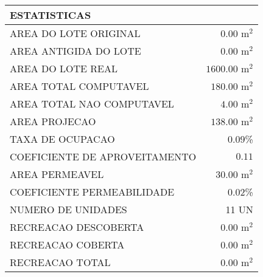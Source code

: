 \documentclass[10pt]{article}
\begin{document}
\begin{tabular}{l r}
\hline
ESTATISTICAS &  \\
\hline
AREA DO LOTE ORIGINAL & $0.00$ m$^2$ \\
AREA ANTIGIDA DO LOTE & $0.00$ m$^2$ \\
AREA DO LOTE REAL & $1600.00$ m$^2$ \\
AREA TOTAL COMPUTAVEL & $180.00$ m$^2$ \\
AREA TOTAL NAO COMPUTAVEL & $4.00$ m$^2$ \\
AREA PROJECAO & $138.00$ m$^2$ \\
TAXA DE OCUPACAO & $0.09$\% \\
COEFICIENTE DE APROVEITAMENTO & $0.11$ \\
AREA PERMEAVEL & $30.00$ m$^2$ \\
COEFICIENTE PERMEABILIDADE & $0.02$\% \\
NUMERO DE UNIDADES & 11 UN \\
RECREACAO DESCOBERTA & $0.00$ m$^2$ \\
RECREACAO COBERTA & $0.00$ m$^2$ \\
RECREACAO TOTAL & $0.00$ m$^2$ \\
\hline
\end{tabular}
\end{document}
